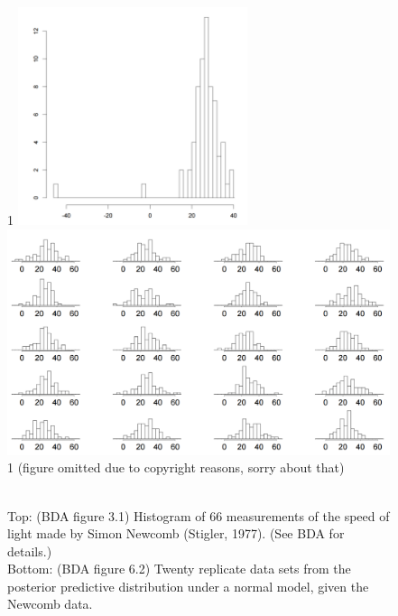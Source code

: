 \documentclass[12pt]{article}
\newcommand{\blind}{1}
\begin{document}
\begin{figure}
\begin{center}
\blind {
\includegraphics[width=0.6\textwidth]{newcomb.png}\\
\includegraphics[width=1.0\textwidth]{newcomb-rep.png}
} \fi
{}\blind { (figure omitted due to copyright reasons, sorry about that) } \fi
\end{center}
\caption{\\Top: (BDA figure 3.1) Histogram of 66 measurements of the speed of light made by Simon Newcomb (Stigler, 1977). (See BDA for details.)\\
Bottom: (BDA figure 6.2) Twenty replicate data sets from the posterior predictive distribution under a normal model, given the Newcomb data.}
\label{figure:newcomb}
\end{figure}
\end{document}
